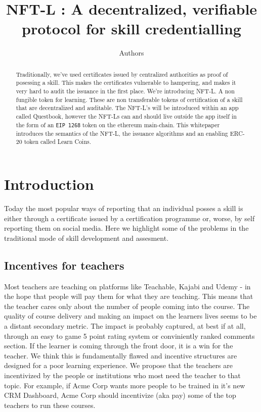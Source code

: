 \documentclass{article}
\author{Authors}
\title{NFT-L : A decentralized, verifiable protocol for skill credentialling}
\begin{document}
  \maketitle
  \begin{abstract}
    Traditionally, we've used certificates issued by centralized authorities as proof of posessing a skill.
    This makes the certificates vulnerable to hampering, and makes it very hard to audit the issuance in the first place.
    We're introducing NFT-L. A non fungible token for learning. These are non transferable tokens of certification of a skill that are decentralized and auditable.
    The NFT-L's will be introduced within an app called Questbook, however the NFT-Ls can and should live outside the app itself in the form of an \texttt{EIP 1268} token on the ethereum main-chain.
    This whitepaper introduces the semantics of the NFT-L, the issuance algorithms and an enabling ERC-20 token called Learn Coins.
  \end{abstract}
  \section{Introduction}
    Today the most popular ways of reporting that an individual posses a skill is either through a certificate issued by a certification programme or, worse, by self reporting them on social media.
    Here we highlight some of the problems in the traditional mode of skill development and assesment. 
    \subsection{Incentives for teachers}
      Most teachers are teaching on platforms like Teachable, Kajabi and Udemy - in the hope that people will pay them for what they are teaching. 
      This means that the teacher cares only about the number of people coming into the course. The quality of course delivery and making an impact on the learners lives seems to be a distant secondary metric. 
      The impact is probably captured, at best if at all, through an easy to game 5 point rating system or conviniently ranked comments section.
      \break
      If the learner is coming through the front door, it is a win for the teacher. We think this is fundamentally flawed and incentive structures are designed for a poor learning experience. 
      We propose that the teachers are incentivized by the people or institutions who most need the teacher to that topic. For example, if Acme Corp wants more people to be trained in it's new CRM Dashboard, Acme Corp should incentivize (aka pay) some of the top teachers to run these courses.
\end{document}
